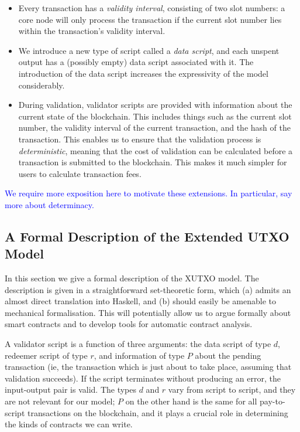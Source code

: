 \documentclass[a4paper]{article}
\newcommand{\blue}[1]{\textcolor{blue}{#1}}
\renewcommand{\i}{\textit}  %
\theoremstyle{definition}  %
\begin{document}
\begin{itemize}
\item Every transaction has a \textit{validity interval}, consisting
  of two slot numbers: a core node will only process the transaction
  if the current slot number lies within the transaction's validity
  interval.
\item We introduce a new type of script called a \i{data script},
  and each unspent output has a (possibly empty) data script
  associated with it.  The introduction of the data script
  increases the expressivity of the model considerably.
\item During validation, validator scripts are provided with
  information about the current state of the blockchain.  This
  includes things such as the current slot number, the validity
  interval of the current transaction, and the hash of the
  transaction.  This enables us to ensure that the validation process
  is \i{deterministic}, meaning that the cost of validation can be
  calculated before a transaction is submitted to the blockchain.
  This makes it much simpler for users to calculate transaction fees.
\end{itemize}
  

\noindent\blue{We require more exposition here to motivate these
  extensions.  In particular, say more about determinacy.}

\subsection{A Formal Description of the Extended UTXO Model}
\label{section:xutxo-spec}

In this section we give a formal description of the XUTXO model.  The
description is given in a straightforward set-theoretic form, which
(a) admits an almost direct translation into Haskell, and (b) should
easily be amenable to mechanical formalisation.  This will potentially
allow us to argue formally about smart contracts and to develop tools
for automatic contract analysis.

A validator script is a function of three arguments: the data script
of type $d$, redeemer script of type $r$, and information of type $P$
about the pending transaction (ie, the transaction which is
  just about to take place, assuming that validation succeeds).  If
the script terminates without producing an error, the input-output
pair is valid. The types $d$ and $r$ vary from script to script, and
they are not relevant for our model; $P$ on the other hand is the same
for all pay-to-script transactions on the blockchain, and it plays a
crucial role in determining the kinds of contracts we can write.
\end{document}
